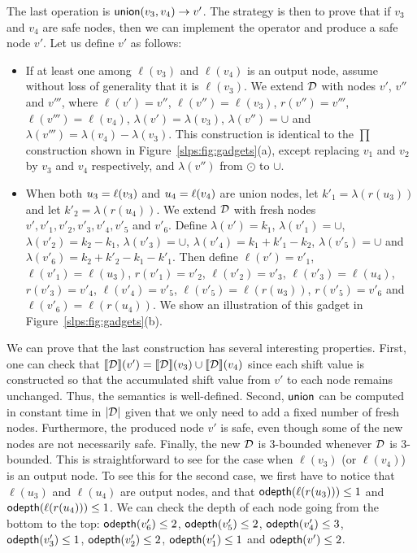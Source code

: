 The last operation is $\mathsf{union}(v_3, v_4)\to v'$. The strategy is then to prove that if $v_3$ and $v_4$ are safe nodes, then we can implement the operator and produce a safe node $v'$. Let us define $v'$ as follows:
\begin{itemize}
	\item If at least one among $\ell(v_3)$ and $\ell(v_4)$ is an output node, assume without loss of generality that it is $\ell(v_3)$. We extend $\mathcal{D}$ with nodes $v'$, $v''$ and $v'''$, where $\ell(v') = v''$, $\ell(v'') = \ell(v_3)$, $r(v'') = v'''$, $\ell(v''') = \ell(v_4)$, $\lambda(v') = \lambda(v_3)$, $\lambda(v'') = \cup$ and $\lambda(v''') = \lambda(v_4) - \lambda(v_3)$. 
	This construction is identical to the $\prod$ construction shown in Figure~\ref{slps:fig:gadgets}(a), except replacing $v_1$ and $v_2$ by $v_3$ and $v_4$ respectively, and $\lambda(v'')$ from $\odot$ to $\cup$.
	\item When both $u_3 = \ell(v_3)$ and $u_4 = \ell(v_4)$ are union nodes, let $k'_1 = \lambda(r(u_3))$ and let $k'_2 = \lambda(r(u_4))$. 
	We extend $\mathcal{D}$ with fresh nodes $v',v'_1,v'_2,v'_3,v'_4,v'_5$ and $v'_6$. 
	Define $\lambda(v') = k_1$, $\lambda(v'_1) = \cup$, $\lambda(v'_2) = k_2 - k_1$, $\lambda(v'_3) = \cup$,  $\lambda(v'_4) = k_1+k'_1-k_2$, $\lambda(v'_5) = \cup$ and $\lambda(v'_6) = k_2 + k'_2 - k_1 - k'_1$. 
	Then define $\ell(v') = v'_1$, $\ell(v'_1) = \ell(u_3)$, $r(v'_1) = v'_2$, $\ell(v'_2) = v'_3$, $\ell(v'_3) = \ell(u_4)$, $r(v'_3) = v'_4$, $\ell(v'_4) = v'_5$, $\ell(v'_5) = \ell(r(u_3))$, $r(v'_5) = v'_6$ and $\ell(v'_6) = \ell(r(u_4))$. 
	We show an illustration of this gadget in Figure~\ref{slps:fig:gadgets}(b).
\end{itemize}



We can prove that the last construction has several interesting properties.
First, one can check that ${\llbracket{\mathcal{D}}\rrbracket}(v') = {\llbracket{\mathcal{D}}\rrbracket}(v_3)\cup {\llbracket{\mathcal{D}}\rrbracket}(v_4)$ since each shift value is 
constructed so that the accumulated shift value from $v'$ to each node remains unchanged.
Thus, the semantics is well-defined. 
Second, $\mathsf{union}$ can be computed in constant time in $|\mathcal{D}|$ given that we only need to add a fixed number of fresh nodes.
Furthermore, the produced node $v'$ is safe, even though some of the new nodes are not necessarily safe. 
Finally, the new $\mathcal{D}$ is 3-bounded whenever $\mathcal{D}$ is 3-bounded. This is straightforward to see for the case when $\ell(v_3)$ (or $\ell(v_4)$) is an output node. To see this for the second case, we first have to notice that $\ell(u_3)$ and $\ell(u_4)$ are output nodes, and that $\mathsf{odepth}(\ell(r(u_3)))\leq 1$ and $\mathsf{odepth}(\ell(r(u_4)))\leq 1$. We can check the depth of each node going from the bottom to the top: $\mathsf{odepth}(v_6') \leq 2$, $\mathsf{odepth}(v_5') \leq 2$, $\mathsf{odepth}(v_4') \leq 3$, $\mathsf{odepth}(v_3')\leq 1$, $\mathsf{odepth}(v_2') \leq 2$, $\mathsf{odepth}(v_1') \leq 1$ and $\mathsf{odepth}(v')\leq 2$.

